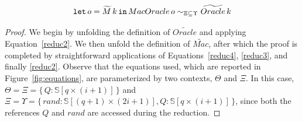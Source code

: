 \begin{lemma}\label{lemma:MacOracle-to-tilde-oracle}
\[ \mathtt{let}\,o=\widetilde{M}\,k\,\mathtt{in}\, MacOracle\,o \sim_{\Xi\subseteq\Upsilon} \widetilde{Oracle}\,k \]
\end{lemma}
\begin{proof}
We begin by unfolding the definition of $\widetilde{Oracle}$ and applying Equation~\ref{reduc2}. We then unfold the definition of $\widetilde{Mac}$, after which the proof is completed by straightforward applications of Equations~\ref{reduc4}, \ref{reduc3}, and finally \ref{reduc2}. Observe that the equations used, which are reported in Figure~\ref{fig:equations}, are parameterized by two contexts, $\Theta$ and $\Xi$. In this case, $\Theta = \Xi = \{\, Q : \mathbb{S}[q \times (i+1)] \,\}$ and $\Xi = \Upsilon = \{\, rand : \mathbb{S}[(q+1) \times (2i+1)], Q : \mathbb{S}[q \times (i+1)]\,\}$, since both the references $Q$ and $rand$ are accessed during the reduction.


\end{proof}
